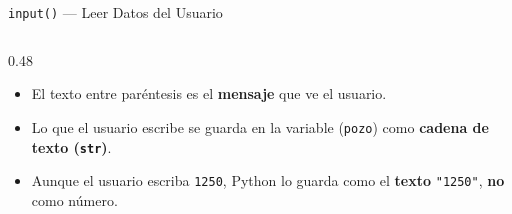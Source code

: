 \documentclass[aspectratio=169, 11pt]{beamer}
\begin{document}
\begin{frame}[fragile,shrink=15]{\texttt{input()} --- Leer Datos del Usuario}
\begin{columns}[T]
    \begin{column}{0.48\textwidth}
      {\scriptsize\color{textMuted}
      \begin{itemize}\setlength{\itemsep}{3pt}
        \item[{\color{arcaRed}\scriptsize\faArrowRight}]
          El texto entre paréntesis es el \textbf{mensaje} que ve el usuario.
        \item[{\color{arcaRed}\scriptsize\faArrowRight}]
          Lo que el usuario escribe se guarda en la variable
          (\texttt{pozo}) como \textbf{cadena de texto (\texttt{str})}.
        \item[{\color{arcaRed}\scriptsize\faExclamationTriangle}]
          Aunque el usuario escriba \texttt{1250},
          Python lo guarda como el \textbf{texto} \texttt{"1250"},
          \textbf{no} como número.
      \end{itemize}
      }
    \end{column}
  \end{columns}
\end{frame}
\end{document}
